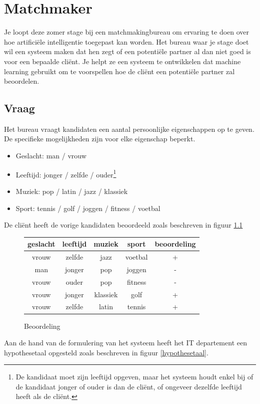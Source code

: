 \documentclass[alternative-exam.tex]{subfiles}
\begin{document}
\chapter{Matchmaker}
Je loopt deze zomer stage bij een matchmakingbureau om ervaring te doen over hoe artifici\"ele intelligentie toegepast kan worden.
Het bureau waar je stage doet wil een systeem maken dat hen zegt of een potenti\"ele partner al dan niet goed is voor een bepaalde cli\"ent. Je helpt ze een systeem te ontwikkelen dat machine learning gebruikt om te voorspellen hoe de cli\"ent een potenti\"ele partner zal beoordelen.

\section{Vraag}
Het bureau vraagt kandidaten een aantal persoonlijke eigenschappen op te geven.
De specifieke mogelijkheden zijn voor elke eigenschap beperkt.
\begin{itemize}
\item Geslacht: man / vrouw
\item Leeftijd: jonger / zelfde / ouder\footnote{De kandidaat moet zijn leeftijd opgeven, maar het systeem houdt enkel bij of de kandidaat jonger of ouder is dan de cli\"ent, of ongeveer dezelfde leeftijd heeft als de cli\"ent.}
\item Muziek: pop / latin / jazz  / klassiek
\item Sport: tennis / golf / joggen / fitness / voetbal
\end{itemize}
De cli\"ent heeft de vorige kandidaten beoordeeld zoals beschreven in figuur \ref{beoordeling}
\begin{figure}[H]
\centering
\caption{Beoordeling}
\label{beoordeling}
\begin{tabular}{|c|c|c|c|c|}
\hline
geslacht & leeftijd & muziek & sport & beoordeling\\
\hline
vrouw & zelfde & jazz & voetbal & +\\
man & jonger & pop & joggen & -\\%
vrouw & ouder & pop & fitness & -\\
vrouw & jonger & klassiek & golf & +\\
vrouw & zelfde & latin & tennis & +\\
\hline
\end{tabular}
\end{figure}
Aan de hand van de formulering van het systeem heeft het IT departement een hypothesetaal opgesteld zoals beschreven in figuur \ref{hypothesetaal}.
\end{document}
